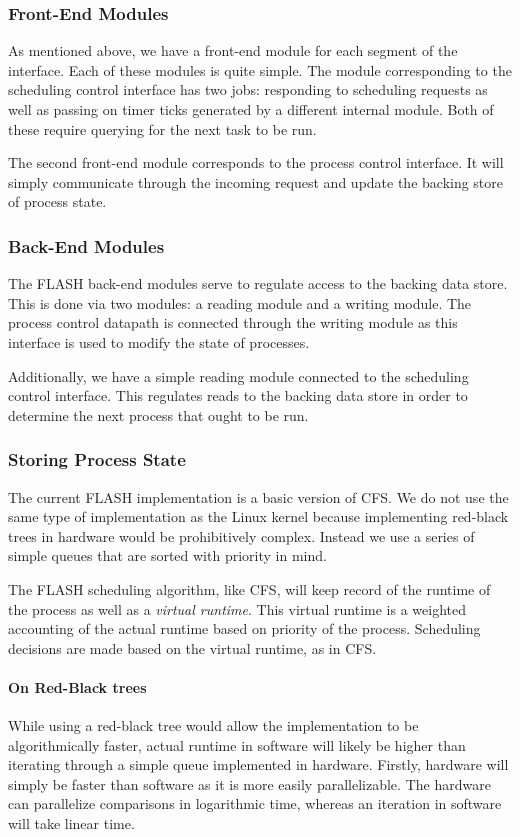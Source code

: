 \documentclass{sig-alternate-10pt}
\begin{document}
\subsubsection{Front-End Modules}
As mentioned above, we have a front-end module for each segment of the
interface.  Each of these modules is quite simple.  The module corresponding
to the scheduling control interface has two jobs: responding to scheduling requests
as well as passing on timer ticks generated by a different internal module.
Both of these require querying for the next task to be run.

The second front-end module corresponds to the process control interface.
It will simply communicate through the incoming request and update the
backing store of process state.

\subsubsection{Back-End Modules}
The FLASH back-end modules serve to regulate access to the backing data
store.  This is done via two modules: a reading module and a writing module.
The process control datapath is connected through the writing module as this
interface is used to modify the state of processes.

Additionally, we have a simple reading module connected to the scheduling
control interface.  This regulates reads to the backing data store in order
to determine the next process that ought to be run.

\subsubsection{Storing Process State}
The current FLASH implementation is a basic version of CFS.  We do not use
the same type of implementation as the Linux kernel because implementing
red-black trees in hardware would be prohibitively complex.  Instead we use
a series of simple queues that are sorted with priority in mind.

The FLASH scheduling algorithm, like CFS, will keep record of the runtime of
the process as well as a \emph{virtual runtime}.  This virtual runtime is a
weighted accounting of the actual runtime based on priority of the process.
Scheduling decisions are made based on the virtual runtime, as in CFS.

\paragraph{On Red-Black trees}
While using a red-black tree would allow the implementation to be
algorithmically faster, actual runtime in software will likely be higher
than iterating through a simple queue implemented in hardware.  Firstly,
hardware will simply be faster than software as it is more easily
parallelizable.  The hardware can parallelize comparisons in logarithmic
time, whereas an iteration in software will take linear time.
\end{document}
